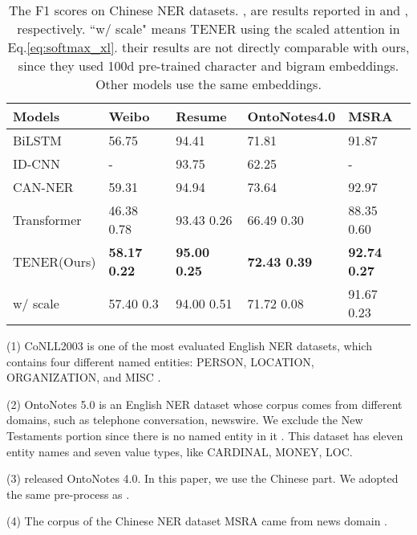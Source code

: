 \documentclass[11pt,a4paper]{article}
\begin{document}
\begin{table*}[t]\small \centering
  \begin{tabular}{lllll}
  \toprule
  	 Models            & Weibo  & Resume    & OntoNotes4.0    & MSRA             \\ \hline
     BiLSTM  & 56.75      & 94.41             & 71.81            & 91.87            \\
     ID-CNN  & -                 & 93.75             & 62.25            & -                \\
     CAN-NER \citep{DBLP:conf/naacl/ZhuW19} & 59.31             & 94.94             & 73.64            & 92.97            \\
     Transformer      & 46.38  0.78  & 93.43  0.26  & 66.49   0.30 & 88.35  0.60 \\
     TENER(Ours)  & \textbf{58.17  0.22}  & \textbf{95.00  0.25}  & \textbf{72.43  0.39} & \textbf{92.74  0.27} \\
     \quad w/ scale    & 57.40  0.3  & 94.00  0.51 & 71.72  0.08 & 91.67  0.23\\
     \bottomrule
  \end{tabular}
\caption{The F1 scores on Chinese NER datasets. , are results reported in \citep{DBLP:conf/acl/ZhangY18} and \citep{DBLP:conf/ijcai/GuiM0ZJH19}, respectively. ``w/ scale" means TENER using the scaled attention in Eq.\eqref{eq:softmax_xl}.
 their results are not directly comparable with ours, since they used 100d pre-trained character and bigram embeddings. Other models use the same embeddings.
} \label{tab:cn_ner}
\end{table*}

(1) CoNLL2003 is one of the most evaluated English NER datasets, which contains four different named entities: PERSON, LOCATION, ORGANIZATION, and MISC \cite{DBLP:conf/conll/SangM03}.

(2) OntoNotes 5.0 is an English NER dataset whose corpus comes from different domains, such as telephone conversation, newswire. We exclude the New Testaments portion since there is no named entity in it \cite{chen2019grn,DBLP:journals/tacl/ChiuN16}. This dataset has eleven entity names and seven value types, like CARDINAL, MONEY, LOC.

(3) \citet{Weischedel2011ontonotes} released OntoNotes 4.0. In this paper, we use the Chinese part. We adopted the same pre-process as \cite{DBLP:conf/naacl/CheWML13}.

(4) The corpus of the Chinese NER dataset MSRA came from news domain \cite{DBLP:conf/acl-sighan/Levow06}.
\end{document}
